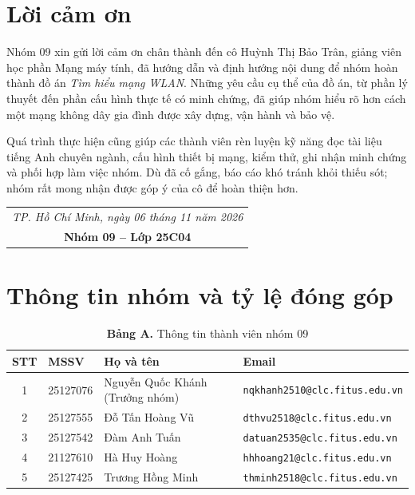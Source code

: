 \documentclass[12pt,a4paper]{article}
\numberwithin{figure}{section}
\numberwithin{table}{section}
\newcommand{\mono}[1]{\texttt{#1}}
\begin{document}
\setcounter{page}{2}

\section*{Lời cảm ơn}
Nhóm 09 xin gửi lời cảm ơn chân thành đến cô Huỳnh Thị Bảo Trân, giảng viên
học phần Mạng máy tính, đã hướng dẫn và định hướng nội dung để nhóm hoàn thành
đồ án \emph{Tìm hiểu mạng WLAN}. Những yêu cầu cụ thể của đồ án, từ phần lý
thuyết đến phần cấu hình thực tế có minh chứng, đã giúp nhóm hiểu rõ hơn cách
một mạng không dây gia đình được xây dựng, vận hành và bảo vệ.

Quá trình thực hiện cũng giúp các thành viên rèn luyện kỹ năng đọc tài liệu
tiếng Anh chuyên ngành, cấu hình thiết bị mạng, kiểm thử, ghi nhận minh chứng
và phối hợp làm việc nhóm. Dù đã cố gắng, báo cáo khó tránh khỏi thiếu sót;
nhóm rất mong nhận được góp ý của cô để hoàn thiện hơn.

\vspace{1em}
\hfill
\begin{tabular}{c}\textit{TP. Hồ Chí Minh, ngày 06 tháng 11 năm 2026}\\
  \textbf{Nhóm 09 -- Lớp 25C04}
\end{tabular}

\clearpage
\section*{Thông tin nhóm và tỷ lệ đóng góp}

\begin{table}[H]
  \centering\small
  \caption*{\textbf{Bảng A.} Thông tin thành viên nhóm 09}
  \begin{tabularx}{\linewidth}{@{}c l l L@{}}
    \toprule
    \textbf{STT} & \textbf{MSSV} & \textbf{Họ và tên} & \textbf{Email}\\
     & 25127076 & Nguyễn Quốc Khánh (Trưởng nhóm) & \mono{nqkhanh2510@clc.fitus.edu.vn}\\
    2 & 25127555 & Đỗ Tấn Hoàng Vũ & \mono{dthvu2518@clc.fitus.edu.vn}\\
    3 & 25127542 & Đàm Anh Tuấn & \mono{datuan2535@clc.fitus.edu.vn}\\
    4 & 21127610 & Hà Huy Hoàng & \mono{hhhoang21@clc.fitus.edu.vn}\\
    5 & 25127425 & Trương Hồng Minh & \mono{thminh2518@clc.fitus.edu.vn}\\
    \bottomrule
  \end{tabularx}
\end{table}
\end{document}
